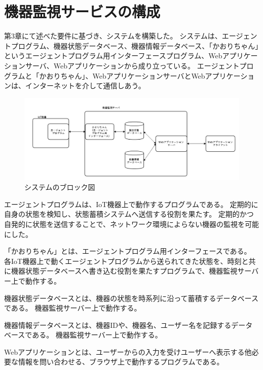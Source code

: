 \section{機器監視サービスの構成}
第3章にて述べた要件に基づき、システムを構築した。
システムは、エージェントプログラム、機器状態データベース、機器情報データベース、「かおりちゃん」というエージェントプログラム用インターフェースプログラム、Webアプリケーションサーバ、Webアプリケーションから成り立っている。
エージェントプログラムと「かおりちゃん」、WebアプリケーションサーバとWebアプリケーションは、インターネットを介して通信しあう。
\medskip

\begin{figure}[htbp]
\includegraphics[width=16cm]{images/blockdiagram2.png}
\caption{システムのブロック図}
\label{fig:blockdiagram}
\end{figure}

エージェントプログラムは、IoT機器上で動作するプログラムである。
定期的に自身の状態を検知し、状態蓄積システムへ送信する役割を果たす。
定期的かつ自発的に状態を送信することで、ネットワーク環境によらない機器の監視を可能にした。
\medskip

「かおりちゃん」とは、エージェントプログラム用インターフェースである。
各IoT機器上で動くエージェントプログラムから送られてきた状態を、時刻と共に機器状態データベースへ書き込む役割を果たすプログラムで、機器監視サーバー上で動作する。
\medskip

機器状態データベースとは、機器の状態を時系列に沿って蓄積するデータベースである。
機器監視サーバー上で動作する。
\medskip

機器情報データベースとは、機器IDや、機器名、ユーザー名を記録するデータベースである。
機器監視サーバー上で動作する。
\medskip

Webアプリケーションとは、ユーザーからの入力を受けユーザーへ表示する他必要な情報を問い合わせる、ブラウザ上で動作するプログラムである。
\medskip

